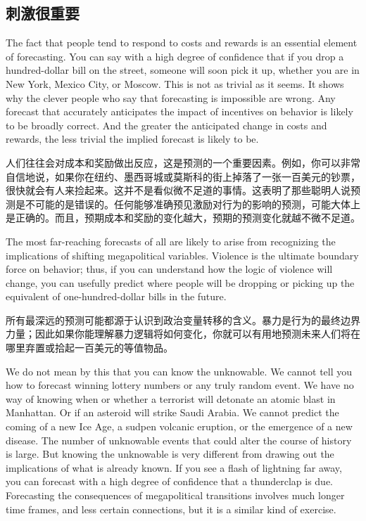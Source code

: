 \subsection{刺激很重要}
\begin{paracol}{2}
The fact that people tend to respond to costs and rewards is an essential element of forecasting. You can say with a high degree of confidence that if you drop a hundred-dollar bill on the street, someone will soon pick it up, whether you are in New York, Mexico City, or Moscow. This is not as trivial as it seems. It shows why the clever people who say that forecasting is impossible are wrong. Any forecast that accurately anticipates the impact of incentives on behavior is likely to be broadly correct. And the greater the anticipated change in costs and rewards, the less trivial the implied forecast is likely to be.    

\switchcolumn
人们往往会对成本和奖励做出反应，这是预测的一个重要因素。例如，你可以非常自信地说，如果你在纽约、墨西哥城或莫斯科的街上掉落了一张一百美元的钞票，很快就会有人来捡起来。这并不是看似微不足道的事情。这表明了那些聪明人说预测是不可能的是错误的。任何能够准确预见激励对行为的影响的预测，可能大体上是正确的。而且，预期成本和奖励的变化越大，预期的预测变化就越不微不足道。

\switchcolumn*
The most far-reaching forecasts of all are likely to arise from recognizing the implications of shifting megapolitical variables. Violence is the ultimate boundary force on behavior; thus, if you can understand how the logic of violence will change, you can usefully predict where people will be dropping or picking up the equivalent of one-hundred-dollar bills in the future.    

\switchcolumn
所有最深远的预测可能都源于认识到政治变量转移的含义。暴力是行为的最终边界力量；因此如果你能理解暴力逻辑将如何变化，你就可以有用地预测未来人们将在哪里弃置或拾起一百美元的等值物品。

\switchcolumn*
We do not mean by this that you can know the unknowable. We cannot tell you how to forecast winning lottery numbers or any truly random event. We have no way of knowing when or whether a terrorist will detonate an atomic blast in Manhattan. Or if an asteroid will strike Saudi Arabia. We cannot predict the coming of a new Ice Age, a sudpen volcanic eruption, or the emergence of a new disease. The number of unknowable events that could alter the course of history is large. But knowing the unknowable is very different from drawing out the implications of what is already known. If you see a flash of lightning far away, you can forecast with a high degree of confidence that a thunderclap is due. Forecasting the consequences of megapolitical transitions involves much longer time frames, and less certain connections, but it is a similar kind of exercise.    


\end{paracol}
